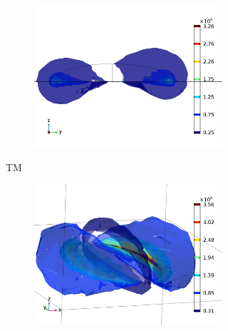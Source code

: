 \begin{figure}[h]
\begin{subfigure}{0.49\textwidth}
    \begin{subfigure}{\textwidth}
        \centering
        \includegraphics[width=0.9\linewidth]{figures/ch4/S5B/fielddistr/s5b_normE_TM_wl1010_phi90(1).png}
    \end{subfigure}
    \caption{TM}
    \end{subfigure}
    \begin{subfigure}{0.49\textwidth}
    \begin{subfigure}{\textwidth}
        \centering
        \includegraphics[width=0.9\linewidth]{figures/ch4/S5B/fielddistr/s5b_normE_TE_wl1010_phi90.png}
    \end{subfigure}
    

\end{subfigure}
\end{figure}
